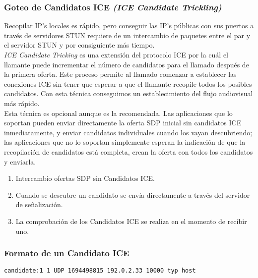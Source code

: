 \subsubsection{Goteo de Candidatos ICE \emph{(ICE Candidate Trickling)}}

Recopilar IP's locales es rápido, pero conseguir las IP's públicas con sus puertos a través de servidores STUN requiere de un intercambio de paquetes entre el par y el servidor STUN y por consiguiente más tiempo.\\

\emph{ICE Candidate Tricking} es una extensión del protocolo ICE por la cuál el llamante puede incrementar el número de candidatos para el llamado después de la primera oferta. Este proceso permite al llamado comenzar a establecer las conexiones ICE sin tener que esperar a que el llamante recopile todos los posibles candidatos. Con esta técnica conseguimos un establecimiento del flujo audiovisual más rápido.\\

Esta técnica es opcional aunque es la recomendada. Las aplicaciones que lo soportan pueden enviar directamente la oferta SDP inicial sin candidatos ICE inmediatamente, y enviar candidatos individuales cuando los vayan descubriendo; las aplicaciones que no lo soportan simplemente esperan la indicación de que la recopilación de candidatos está completa, crean la oferta con todos los candidatos y enviarla.\\

\begin{enumerate}
\item Intercambio ofertas SDP sin Candidatos ICE.
\item Cuando se descubre un candidato se envía directamente a través del servidor de señalización.
\item La comprobación de los Candidatos ICE se realiza en el momento de recibir uno.
\end{enumerate}

\subsubsection{Formato de un Candidato ICE}

\begin{lstlisting}[caption=Ejemplo paquete SDP]
candidate:1 1 UDP 1694498815 192.0.2.33 10000 typ host
\end{lstlisting}

